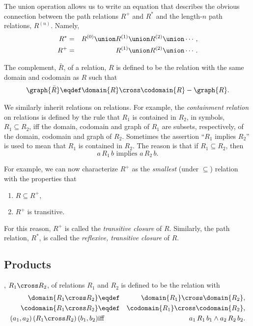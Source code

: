The union operation allows us to write an equation that describes the
obvious connection between the path relations $R^+$ and $R^*$ and the
length-$n$ path relations, $R^{(n)}$.  Namely,
\begin{eqnarray}
R^* &=& R^{(0)} \union  R^{(1)} \union R^{(2)} \union \cdots,\label{R*u}\\
R^+ &=&                 R^{(1)} \union R^{(2)} \union \cdots.\label{R+u}
\end{eqnarray}

The complement, $\bar{R}$, of a relation, $R$ is defined to be the
relation with the same domain and codomain as $R$ such that
\[
\graph{\bar{R}} \eqdef \domain{R}\cross\codomain{R} - \graph{R}.
\]

We similarly inherit relations on relations.  For example, the
\emph{containment relation} on relations is defined by the rule that $R_1$
is contained in $R_2$, in symbols, $R_1 \subseteq R_2$, iff the domain,
codomain and graph of $R_1$ are subsets, respectively, of the domain,
codomain and graph of $R_2$.  Sometimes the assertion ``$R_1$ implies
$R_2$'' is used to mean that $R_1$ is contained in $R_2$.  The reason is
that if $R_1 \subseteq R_2$, then
\[
a\, R_1\, b \text{  implies  } a\, R_2\, b.
\]

For example, we can now characterize $R^+$ as the \emph{smallest} (under
$\subseteq$) relation with the properties that
\begin{enumerate}
\item $R \subseteq R^+$,
\item $R^+$ is transitive.
\end{enumerate}
For this reason, $R^+$ is called the \emph{transitive closure} of $R$.
Similarly, the path relation, $R^*$, is called the \emph{reflexive,
transitive closure} of $R$.

\subsection{Products}
, $R_1 \cross R_2$, of relations
$R_1$ and $R_2$ is defined to be the relation with
\begin{eqnarray*}
\domain{R_1 \cross R_2} &\eqdef& \domain{R_1} \cross \domain{R_2},\\
\codomain{R_1 \cross R_2} &\eqdef& \codomain{R_1} \cross \codomain{R_2},\\
(a_1,a_2)\, (R_1 \cross R_2)\, (b_1,b_2) &\text{iff}& a_1\, R_1\, b_1
\land a_2\, R_2\, b_2.
\end{eqnarray*}

